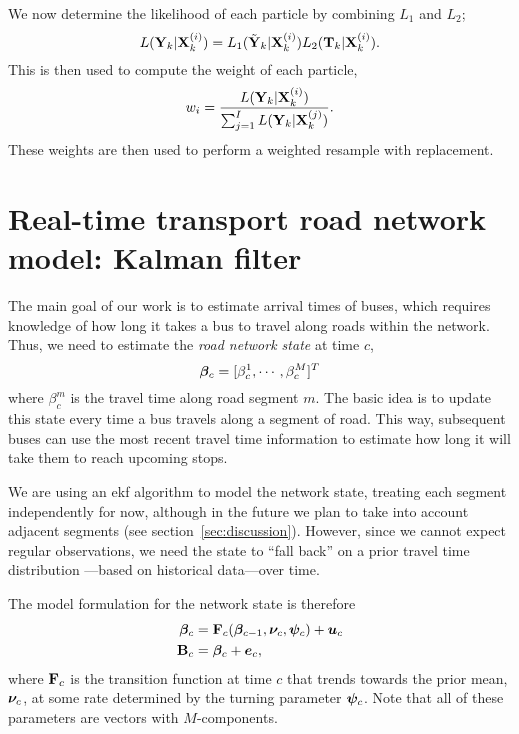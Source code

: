 \documentclass[draftcls,a4paper,onecolumn]{IEEEtran}\usepackage[]{graphicx}\usepackage[]{color}
\begin{document}
We now determine the likelihood of each particle by combining $L_1$ and $L_2$;
\begin{equation}
  \label{eq:particle_likelihood}
  L (\mathbf{Y}_k | \mathbf{X}_k^{(i)}) = L_1(\tilde{\mathbf{Y}}_k|\mathbf{X}_k^{(i)}) L_2(\mathbf{T}_k | \mathbf{X}_k^{(i)}).
\end{equation}
This is then used to compute the weight of each particle,
\begin{equation}
  \label{eq:particle_weights}
  w_i = \frac{L (\mathbf{Y}_k | \mathbf{X}_k^{(i)})}{\sum_{j=1}^I   L (\mathbf{Y}_k | \mathbf{X}_k^{(j)})}.
\end{equation}
These weights are then used to perform a weighted resample with replacement.




\section{Real-time transport road network model: Kalman filter}
\label{sec:kf}

The main goal of our work is to estimate arrival times of buses,
which requires knowledge of how long it takes a bus to
travel along roads within the network.
Thus, we need to estimate the \emph{road network state} at time $c$,
\begin{equation}
  \label{eq:kf_state}
  \boldsymbol{\beta}_c = [\beta^1_c, \cdots, \beta^M_c]^T
\end{equation}
where $\beta^m_c$ is the travel time along road segment $m$.
The basic idea is to update this state every time a bus travels
along a segment of road.
This way, subsequent buses can use the most recent travel time
information to estimate how long it will take them to reach 
upcoming stops.

We are using an \gls{ekf} algorithm to model the network state,
treating each segment independently for now, although in the future
we plan to take into account adjacent segments
(see section~\ref{sec:discussion}).
However, since we cannot expect regular observations,
we need the state to ``fall back'' on a prior travel time distribution%
---based on historical data---over time.

The model formulation for the network state is therefore
\begin{align}
  \label{eq:kf_model}
  \boldsymbol{\beta}_c &= \mathbf{F}_c(\boldsymbol{\beta}_{c-1}, \boldsymbol{\nu}_c, \boldsymbol{\psi}_c) + \boldsymbol{u}_c \\
  \mathbf{B}_c &= \boldsymbol{\beta}_c + \boldsymbol{e}_c,
\end{align}
where $\mathbf{F}_c$ is the transition function at time $c$ that
trends towards the prior mean, $\boldsymbol{\nu}_c$, at some rate determined
by the turning parameter $\boldsymbol{\psi}_c$.
Note that all of these parameters are vectors with $M$-components.
\end{document}
